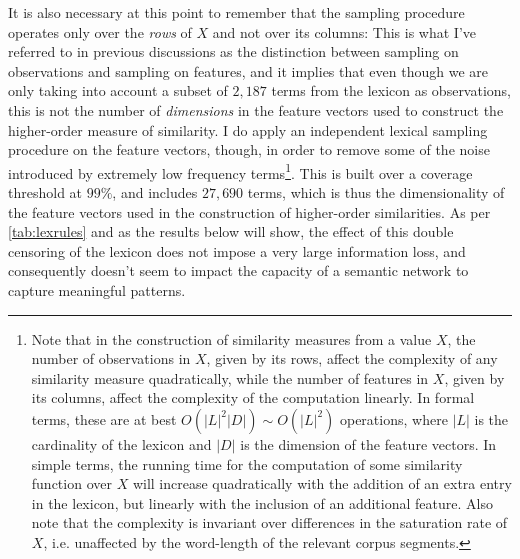 \label{pp:features}
It is also necessary at this point to remember that the sampling procedure operates only over the \emph{rows} of $X$ and not over its columns:
This is what I've referred to in previous discussions as the distinction between sampling on observations and sampling on features, and it implies that even though we are only taking into account a subset of $2,187$ terms from the lexicon as observations, this is not the number of \emph{dimensions} in the feature vectors used to construct the higher-order measure of similarity.
I do apply an independent lexical sampling procedure on the feature vectors, though, in order to remove some of the noise introduced by extremely low frequency terms\footnote{
    Note that in the construction of similarity measures from a value $X$, the number of observations in $X$, given by its rows, affect the complexity of any similarity measure quadratically, while the number of features in $X$, given by its columns, affect the complexity of the computation linearly.
    In formal terms, these are at best $O(|L|^{2}|D|) \sim O(|L|^{2})$ operations, where $|L|$ is the cardinality of the lexicon and $|D|$ is the dimension of the feature vectors.
    In simple terms, the running time for the computation of some similarity function over $X$ will increase quadratically with the addition of an extra entry in the lexicon, but linearly with the inclusion of an additional feature.
    Also note that the complexity is invariant over differences in the saturation rate of $X$, i.e. unaffected by the word-length of the relevant corpus segments.
}.
This is built over a coverage threshold at $99\%$, and includes $27,690$ terms, which is thus the dimensionality of the feature vectors used in the construction of higher-order similarities.
As per \autoref{tab:lexrules} and as the results below will show, the effect of this double censoring of the lexicon does not impose a very large information loss, and consequently doesn't seem to impact the capacity of a semantic network to capture meaningful patterns.

